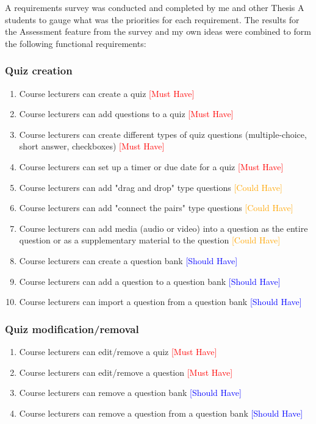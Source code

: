 A requirements survey was conducted and completed by me and other Thesis A students to gauge what was the priorities for each requirement. The results for the Assessment feature from the survey and my own ideas were combined to form the following functional requirements:

\subsubsection{Quiz creation}
\begin{enumerate}
	\item Course lecturers can create a quiz \textcolor{Red}{[Must Have]}
	\item Course lecturers can add questions to a quiz \textcolor{Red}{[Must Have]}
	\item Course lecturers can create different types of quiz questions (multiple-choice, short answer, checkboxes) \textcolor{Red}{[Must Have]}
	\item Course lecturers can set up a timer or due date for a quiz \textcolor{Red}{[Must Have]}
	\item Course lecturers can add "drag and drop" type questions \textcolor{Orange}{[Could Have]}
	\item Course lecturers can add "connect the pairs" type questions \textcolor{Orange}{[Could Have]}
	\item Course lecturers can add media (audio or  video) into a question as the entire question or as a supplementary material to the question \textcolor{Orange}{[Could Have]}
	\item Course lecturers can create a question bank \textcolor{Blue}{[Should Have]}
	\item Course lecturers can add a question to a question bank \textcolor{Blue}{[Should Have]}
	\item Course lecturers can import a question from a question bank \textcolor{Blue}{[Should Have]}
\end{enumerate}

\subsubsection{Quiz modification/removal}
\begin{enumerate}
	\item Course lecturers can edit/remove a quiz \textcolor{Red}{[Must Have]}
	\item Course lecturers can edit/remove a question \textcolor{Red}{[Must Have]}
	\item Course lecturers can remove a question bank \textcolor{Blue}{[Should Have]}
	\item Course lecturers can remove a question from a question bank \textcolor{Blue}{[Should Have]}
\end{enumerate}

